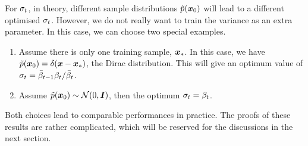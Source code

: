 For $\sigma_t$,  in theory, different sample distributions $
\tilde{p}(\bm{x}_0)$ will lead to a different optimised $\sigma_t$. However, we do not really want to train the variance as an extra parameter. In this case, we can choose two special examples.
\begin{myquote}
    \begin{enumerate}
        \item Assume there is only one training sample, $\bm{x}_{*}$. In this case, we have $\tilde{p}(\bm{x}_0)=\delta(\bm{x}-\bm{x}_{*})$, the Dirac distribution. This will give an optimum value of $\sigma_t=\bar{\beta}_{t-1}\beta_t/\bar{\beta}_t$.
        \item Assume $\tilde{p}(\bm{x}_0)\sim\mathcal{N}(0,\bm{I})$, then the optimum $\sigma_t=\beta_t$.
    \end{enumerate}
\end{myquote}
Both choices lead to comparable performances in practice. The proofs of these results are rather complicated, which will be reserved for the discussions in the next section.